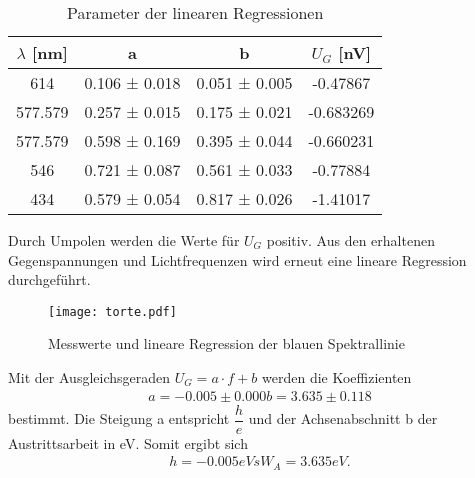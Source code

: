  \begin{table}[H]
    \centering
    \caption{Parameter der linearen Regressionen}
    \label{tab:some}
    \begin{tabular}{c c c c}
     \toprule
      $\lambda$ [nm] & a & b & $U_G$ [nV]\\
      \midrule
      614     & 0.106 ± 0.018&0.051 ± 0.005&-0.47867  \\
      577.579 & 0.257 ± 0.015&0.175 ± 0.021&-0.683269 \\
      577.579 & 0.598 ± 0.169&0.395 ± 0.044&-0.660231 \\
      546     & 0.721 ± 0.087&0.561 ± 0.033&-0.77884  \\
      434     & 0.579 ± 0.054&0.817 ± 0.026&-1.41017  \\
     \bottomrule
    \end{tabular}
  \end{table} 
  Durch Umpolen werden die Werte für $U_G$ positiv.
  Aus den erhaltenen Gegenspannungen und Lichtfrequenzen wird erneut eine lineare 
  Regression durchgeführt.
  \begin{figure}
    \centering
    \texttt{[image: torte.pdf]}
    \caption{Messwerte und lineare Regression der blauen Spektrallinie}
    \label{fig:torte}
  \end{figure}
  Mit der Ausgleichsgeraden $U_G=a\cdot f +b$ werden die Koeffizienten
  \begin{align*}
    a = -0.005 ± 0.000
    b = 3.635 ± 0.118
  \end{align*}
  bestimmt. Die Steigung a entspricht $\dfrac{h}{e}$ und der Achsenabschnitt
  b der Austrittsarbeit in eV. Somit ergibt sich
  \begin{align*}
    h = -0.005 eVs
    W_A = 3.635 eV.
  \end{align*}

